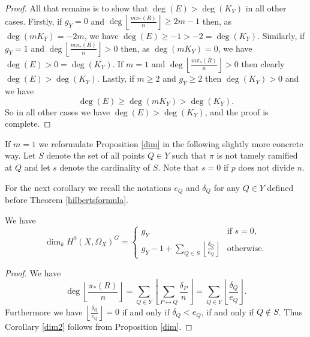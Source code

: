 \begin{proof}
    
    All that remains is to show that $\deg(E)>\deg(K_Y)$ in all other cases.
    Firstly, if $g_Y=0$ and $\deg \left\lfloor\frac{m\pi_*(R)}{n} \right\rfloor \geq 2m-1$ then, as $\deg(mK_Y)=-2m$, we have $\deg \left( E \right) \geq -1 >-2 = \deg(K_Y)$.
    Similarly, if $g_Y=1$ and $\deg \left\lfloor\frac{m\pi_*(R)}{n} \right\rfloor >0$ then, as $\deg \left( mK_Y \right)=0$, we have $\deg \left( E \right) > 0 = \deg (K_Y)$.
    If $m=1$ and $\deg \left\lfloor\frac{m\pi_*(R)}{n} \right\rfloor >0$ then clearly $\deg \left( E \right) > \deg (K_Y)$.
    Lastly, if $m\geq 2$ and $g_Y\geq 2$ then $\deg (K_Y) > 0$ and we have 
        \begin{equation*}
        \deg \left( E \right) \geq \deg\left( mK_Y \right) > \deg (K_Y).
        \end{equation*}
    So in all other cases we have $\deg(E)>\deg(K_Y)$, and the proof is complete.
    \end{proof}


If $m=1$ we reformulate Proposition \ref{dim} in the following slightly more concrete way. 
Let $S$ denote the set of all points $Q\in Y$ such that $\pi$ is not tamely ramified at $Q$ and let $s$ denote the cardinality of $S$. 
Note that $s=0$ if $p$ does not divide $n$.


For the next corollary we recall the notations $e_Q$ and $\delta_Q$ for any $Q\in Y$ defined before Theorem \ref{hilbertsformula}.


    \begin{cor}\label{dim2}
    We have 
        \begin{equation*}
        \dim_kH^0(X,\Omega_X)^G = 
            \begin{cases}
            g_Y & \mbox{if } s=0, \\
            g_Y-1+\sum_{Q\in S}\left\lfloor \frac{\delta_Q}{e_Q} \right\rfloor & \mbox{otherwise}.
            \end{cases}
        \end{equation*}
    \end{cor}
    \begin{proof}
    We have
        \[
        \deg\left\lfloor\frac{\pi_*(R)}{n} \right\rfloor = \sum_{Q\in Y}\left\lfloor\sum_{P\mapsto Q} \frac{\delta_P}{n} \right\rfloor = \sum_{Q\in Y} \left\lfloor \frac{\delta_Q}{e_Q} \right\rfloor.
        \]
    Furthermore we have $\left\lfloor \frac{\delta_Q}{e_Q} \right\rfloor = 0$ if and only if $\delta_Q<e_Q$, \ie if and only if $Q\notin S$. 
    Thus Corollary \ref{dim2} follows from Proposition \ref{dim}.
    \end{proof}

